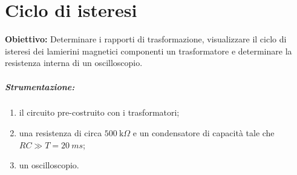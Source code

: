 \chapter{Ciclo di isteresi}

\renewcommand\thesection{\Roman{section}}

\textbf{Obiettivo:} Determinare i rapporti di trasformazione, visualizzare il ciclo di isteresi dei lamierini magnetici componenti un trasformatore e determinare la resistenza interna di un oscilloscopio.

\paragraph{Strumentazione:} 
\begin{enumerate}
    \item il circuito pre-costruito con i trasformatori;
    \item una resistenza di circa $\SI{500}{\kilo\Omega}$ e un condensatore di capacità tale che $RC\gg T=\SI{20}{ms}$;
    \item un oscilloscopio.
\end{enumerate}

